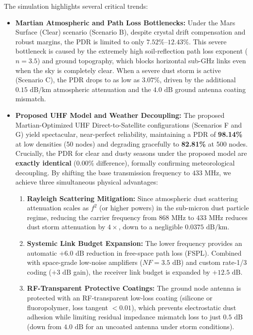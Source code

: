 \documentclass{ijuc}
\begin{document}
The simulation highlights several critical trends:
\begin{itemize}
    \item \textbf{Martian Atmospheric and Path Loss Bottlenecks:} Under the Mars Surface (Clear) scenario (Scenario B), despite crystal drift compensation and robust margins, the PDR is limited to only $7.52\%$--$12.43\%$. This severe bottleneck is caused by the extremely high soil-reflection path loss exponent ($n = 3.5$) and ground topography, which blocks horizontal sub-GHz links even when the sky is completely clear. When a severe dust storm is active (Scenario C), the PDR drops to as low as $3.07\%$, driven by the additional $0.15\text{ dB/km}$ atmospheric attenuation and the $4.0\text{ dB}$ ground antenna coating mismatch.
    \item \textbf{Proposed UHF Model and Weather Decoupling:} The proposed Martian-Optimized UHF Direct-to-Satellite configurations (Scenarios F and G) yield spectacular, near-perfect reliability, maintaining a PDR of \textbf{98.14\%} at low densities (50 nodes) and degrading gracefully to \textbf{82.81\%} at 500 nodes. Crucially, the PDR for clear and dusty seasons under the proposed model are \textbf{exactly identical} (0.00\% difference), formally confirming meteorological decoupling. By shifting the base transmission frequency to $433\text{ MHz}$, we achieve three simultaneous physical advantages:
    \begin{enumerate}
        \item \textbf{Rayleigh Scattering Mitigation:} Since atmospheric dust scattering attenuation scales as $f^2$ (or higher powers) in the sub-micron dust particle regime, reducing the carrier frequency from $868\text{ MHz}$ to $433\text{ MHz}$ reduces dust storm attenuation by $4\times$, down to a negligible $0.0375\text{ dB/km}$.
        \item \textbf{Systemic Link Budget Expansion:} The lower frequency provides an automatic $+6.0\text{ dB}$ reduction in free-space path loss (FSPL). Combined with space-grade low-noise amplifiers ($NF = 3.5\text{ dB}$) and custom rate-1/3 coding ($+3\text{ dB}$ gain), the receiver link budget is expanded by $+12.5\text{ dB}$.
        \item \textbf{RF-Transparent Protective Coatings:} The ground node antenna is protected with an RF-transparent low-loss coating (silicone or fluoropolymer, loss tangent $< 0.01$), which prevents electrostatic dust adhesion while limiting residual impedance mismatch loss to just $0.5\text{ dB}$ (down from $4.0\text{ dB}$ for an uncoated antenna under storm conditions).

\end{enumerate}
\end{itemize}
\end{document}
